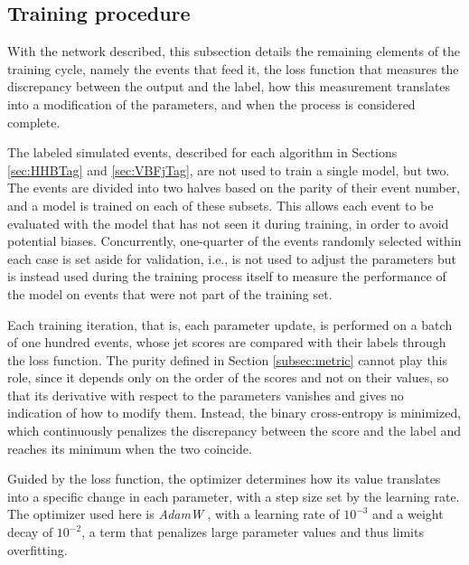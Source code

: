 \subsection{Training procedure}
\label{subsec:training}
%
With the network described, this subsection details the remaining elements of the training cycle, namely the events that feed it, the loss function that measures the discrepancy between the output and the label, how this measurement translates into a modification of the parameters, and when the process is considered complete.\medskip

The labeled simulated events, described for each algorithm in Sections \ref{sec:HHBTag} and \ref{sec:VBFjTag}, are not used to train a single model, but two. The events are divided into two halves based on the parity of their event number, and a model is trained on each of these subsets. This allows each event to be evaluated with the model that has not seen it during training, in order to avoid potential biases. Concurrently, one-quarter of the events randomly selected within each case is set aside for validation, i.e., is not used to adjust the parameters but is instead used during the training process itself to measure the performance of the model on events that were not part of the training set.


Each training iteration, that is, each parameter update, is performed on a batch of one hundred events, whose jet scores are compared with their labels through the loss function. The purity defined in Section \ref{subsec:metric} cannot play this role, since it depends only on the order of the scores and not on their values, so that its derivative with respect to the parameters vanishes and gives no indication of how to modify them. Instead, the binary cross-entropy \cite{Goodfellow2016} is minimized, which continuously penalizes the discrepancy between the score and the label and reaches its minimum when the two coincide.

Guided by the loss function, the optimizer determines how its value translates into a specific change in each parameter, with a step size set by the learning rate. The optimizer used here is \textit{AdamW} \cite{Loshchilov2019}, with a learning rate of $10^{-3}$ and a weight decay of $10^{-2}$, a term that penalizes large parameter values and thus limits overfitting.\medskip






